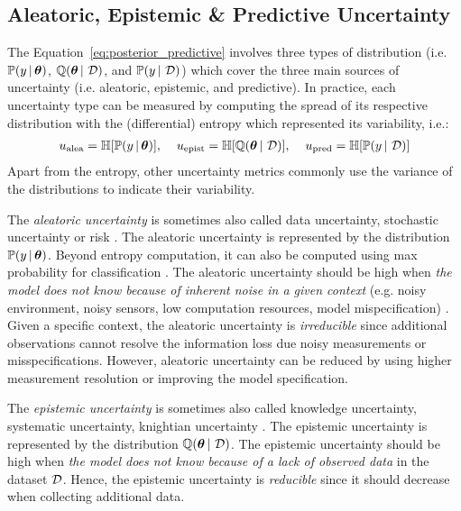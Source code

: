 \subsection{Aleatoric, Epistemic \& Predictive Uncertainty}

The Equation~\ref{eq:posterior_predictive} involves three types of distribution (i.e. $\mathbb{P}(y \,|\, \bm{\theta})$, $\operatorname{\mathbb{Q}}(\bm{\theta} \,|\, \operatorname{\mathcal{D}})$, and $\mathbb{P}(y \,|\, \operatorname{\mathcal{D}})$) which cover the three main sources of uncertainty (i.e. aleatoric, epistemic, and predictive).
In practice, each uncertainty type can be measured by computing the spread of its respective distribution with the (differential) entropy which represented its variability, i.e.:
\begin{align}
     u_\text{alea} = \operatorname{\mathbb{H}}[\mathbb{P}(y \,|\, \bm{\theta})], \hspace{4mm}
     u_\text{epist} = \operatorname{\mathbb{H}}[\operatorname{\mathbb{Q}}(\bm{\theta} \,|\, \operatorname{\mathcal{D}})], \hspace{4mm}
     u_\text{pred} = \operatorname{\mathbb{H}}[\mathbb{P}(y \,|\, \operatorname{\mathcal{D}})]
\end{align}
Apart from the entropy, other uncertainty metrics commonly use the variance of the distributions to indicate their variability.

The \emph{aleatoric uncertainty} is sometimes also called data uncertainty, stochastic uncertainty or risk \cite{hullermeier2021aleatoric,knight1921, malini2018}. 
The aleatoric uncertainty is represented by the distribution $\mathbb{P}(y \,|\, \bm{\theta})$.
Beyond entropy computation, it can also be computed using max probability for classification \cite{malini2018}.
The aleatoric uncertainty should be high when \emph{the model does not know because of inherent noise in a given context} (e.g. noisy environment, noisy sensors, low computation resources, model mispecification) \cite{wenger2022posterior, hullermeier2021aleatoric}.
Given a specific context, the aleatoric uncertainty is \emph{irreducible} since additional observations cannot resolve the information loss due noisy measurements or misspecifications. 
However, aleatoric uncertainty can be reduced by using higher measurement resolution or improving the model specification. 

The \emph{epistemic uncertainty} is sometimes also called knowledge uncertainty, systematic uncertainty, knightian uncertainty \cite{hullermeier2021aleatoric,knight1921,malini2018}.
The epistemic uncertainty is represented by the distribution $\operatorname{\mathbb{Q}}(\bm{\theta} \,|\, \operatorname{\mathcal{D}})$.
The epistemic uncertainty should be high when \emph{the model does not know because of a lack of observed data} in the dataset $\operatorname{\mathcal{D}}$.
Hence, the epistemic uncertainty is \emph{reducible} since it should decrease when collecting additional data.

